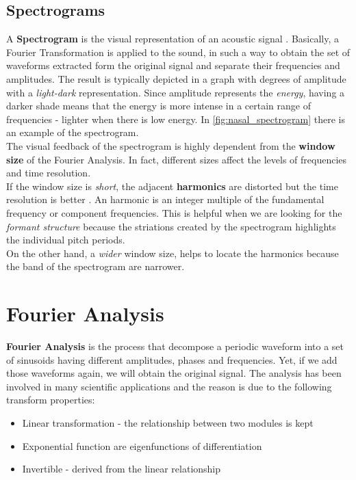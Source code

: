 \subsection{Spectrograms}
\label{sec:spectrograms}
A \textbf{Spectrogram} is the visual representation of an acoustic signal \cite{spectrogram_def}. Basically, a Fourier Transformation is applied to the sound, in such a way to obtain the set of waveforms extracted form the original signal and separate their frequencies and amplitudes. The result is typically depicted in a graph with degrees of amplitude with a \textit{light-dark} representation. Since amplitude represents the \textit{energy}, having a darker shade means that the energy is more intense in a certain range of frequencies - lighter when there is low energy. In \ref{fig:nasal_spectrogram} there is an example of the spectrogram. \\
\noindent The visual feedback of the spectrogram is highly dependent from the \textbf{window size} of the Fourier Analysis. In fact, different sizes affect the levels of frequencies and time resolution. \\
\noindent If the window size is \textit{short}, the adjacent \textbf{harmonics} are distorted but the time resolution is better \cite{spectrogram_def}. An harmonic is an integer multiple of the fundamental frequency or component frequencies. This is helpful when we are looking for the \textit{formant structure} because the striations created by the spectrogram highlights the individual pitch periods. \\
\noindent On the other hand, a \textit{wider} window size, helps to locate the harmonics because the band of the spectrogram are narrower.


\section{Fourier Analysis}
\label{sec:fourier_analysis}
\textbf{Fourier Analysis} is the process that decompose a periodic waveform into a set of sinusoids having different amplitudes, phases and frequencies. Yet, if we add those waveforms again, we will obtain the original signal. The analysis has been involved in many scientific applications and the reason is due to the following transform properties:

\begin{itemize}
	\item Linear transformation - the relationship between two modules is kept
	\item Exponential function are eigenfunctions of differentiation \cite{evans1997partial}
	\item Invertible - derived from the linear relationship
\end{itemize}

